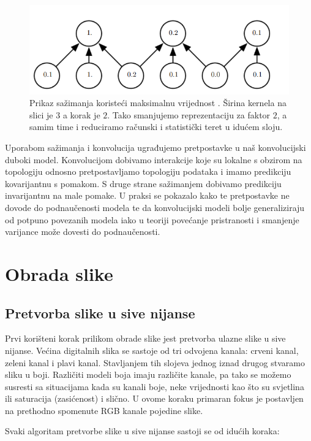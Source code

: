 \documentclass[times, utf8, diplomski]{fer}
\theoremstyle{definition}
\begin{document}
\begin{figure}[h]
\centering
\includegraphics[scale=0.5]{pooling.png}
\caption{Prikaz sažimanja koristeći maksimalnu vrijednost . Širina kernela na slici je $3$ a korak je $2$. Tako smanjujemo reprezentaciju za faktor $2$, a samim time i reduciramo računski i statistički teret u idućem sloju.}
\label{konvolucija}
\end{figure}

Uporabom sažimanja i konvolucija ugrađujemo pretpostavke u naš konvolucijski duboki model. Konvolucijom dobivamo interakcije koje su lokalne s obzirom na topologiju odnosno pretpostavljamo topologiju podataka i imamo predikciju kovarijantnu s pomakom. S druge strane sažimanjem dobivamo predikciju invarijantnu na male pomake. U praksi se pokazalo kako te pretpostavke ne dovode do podnaučenosti modela te da konvolucijski modeli bolje generaliziraju od potpuno povezanih modela iako u teoriji povećanje pristranosti i smanjenje varijance može dovesti do podnaučenosti.

\chapter{Obrada slike}
\section{Pretvorba slike u sive nijanse}
Prvi korišteni korak prilikom obrade slike jest pretvorba ulazne slike u sive nijanse. Većina digitalnih slika se sastoje od tri odvojena kanala: crveni kanal, zeleni kanal i plavi kanal. Stavljanjem tih slojeva jednog iznad drugog stvaramo sliku u boji. Različiti modeli boja imaju različite kanale, pa tako se možemo susresti sa situacijama kada su kanali boje, neke vrijednosti kao što su svjetlina ili saturacija (zasićenost) i slično. U ovome koraku primaran fokus je postavljen na prethodno spomenute RGB kanale pojedine slike.

Svaki algoritam pretvorbe slike u sive nijanse sastoji se od idućih koraka:
\end{document}

